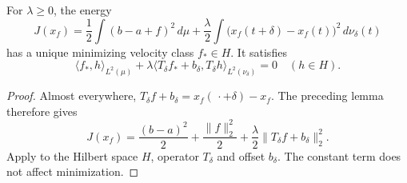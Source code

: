 \begin{theorem}
\label{thm:interval-minimum}
For $\lambda\ge0$, the energy
\[
 J(x_f)=\frac12\int (b-a+f)^2\,d\mu
  +\frac\lambda2\int\bigl(x_f(t+\delta)-x_f(t)\bigr)^2\,d\nu_\delta(t)
\]
has a unique minimizing velocity class $f_*\in H$. It satisfies
\[
 \langle f_*,h\rangle_{L^2(\mu)}
 +\lambda\langle T_\delta f_*+b_\delta,T_\delta h\rangle_{L^2(\nu_\delta)}=0
 \quad(h\in H).
\]
\end{theorem}
\begin{proof}
Almost everywhere,
$T_\delta f+b_\delta=x_f(\,\cdot+\delta)-x_f$.
The preceding lemma therefore gives
\[
 J(x_f)=\frac{(b-a)^2}{2}
       +\frac{\lVert f\rVert_2^2}{2}
       +\frac\lambda2\lVert T_\delta f+b_\delta\rVert_2^2.
\]
Apply  to the Hilbert space $H$,
operator $T_\delta$ and offset $b_\delta$. The constant term does
not affect minimization.
\end{proof}


